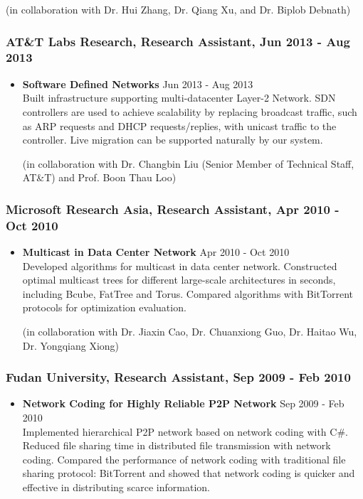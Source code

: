 \documentclass[10pt]{res} %
\begin{document}
\begin{resume}
\begin{itemize}
(in collaboration with Dr. Hui Zhang, Dr. Qiang Xu, and Dr. Biplob Debnath)
\end{itemize}


\subsubsection{AT\&T Labs Research, Research Assistant, Jun 2013 - Aug 2013}
\begin{itemize}
\item {\bf Software Defined Networks} \hfill Jun 2013 - Aug 2013\\
Built infrastructure supporting multi-datacenter Layer-2 Network. SDN controllers
are used to achieve scalability by replacing broadcast traffic, such as ARP
requests and DHCP requests/replies, with unicast traffic to the controller. Live
migration can be supported naturally by our system.

(in collaboration with Dr. Changbin Liu (Senior Member of Technical Staff, AT\&T) and Prof. Boon Thau Loo)
\end{itemize}

\subsubsection{Microsoft Research Asia, Research Assistant, Apr 2010 - Oct 2010}
\begin{itemize}
\item {\bf Multicast in Data Center Network} \hfill Apr 2010 - Oct 2010\\
Developed algorithms for multicast in data center network. Constructed optimal
multicast trees for different large-scale architectures in seconds, including
Bcube, FatTree and Torus. Compared algorithms with BitTorrent protocols for
optimization evaluation.

(in collaboration with Dr. Jiaxin Cao, Dr. Chuanxiong Guo, Dr. Haitao Wu, Dr. Yongqiang Xiong)
\end{itemize}

\subsubsection{Fudan University, Research Assistant, Sep 2009 - Feb 2010}
\begin{itemize}
\item {\bf Network Coding for Highly Reliable P2P Network} \hfill Sep 2009 - Feb 2010\\
Implemented hierarchical P2P network based on network coding with C$\#$. Reduced
file sharing time in distributed file transmission with network coding. Compared
the performance of network coding with traditional file sharing protocol:
BitTorrent and showed that network coding is quicker and effective in
distributing scarce information.


\end{itemize}
\end{resume}
\end{document}
